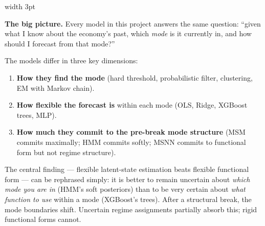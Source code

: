 \documentclass[11pt, a4paper]{article}
\newenvironment{greenbox}{%
  \vspace{4pt}\par\noindent%
  {\color{mygreen}\vrule width 3pt}\hspace{6pt}%
  \begin{minipage}{\dimexpr\linewidth-9pt\relax}\vspace{2pt}%
}{%
  \vspace{2pt}\end{minipage}\par\vspace{4pt}%
}
\begin{document}
\bigskip

\begin{greenbox}
\textbf{The big picture.}
Every model in this project answers the same question: ``given what I know
about the economy's past, which \emph{mode} is it currently in, and how should
I forecast from that mode?''

The models differ in three key dimensions:
\begin{enumerate}[itemsep=2pt]
  \item \textbf{How they find the mode} (hard threshold, probabilistic filter,
        clustering, EM with Markov chain).
  \item \textbf{How flexible the forecast is} within each mode (OLS, Ridge,
        XGBoost trees, MLP).
  \item \textbf{How much they commit to the pre-break mode structure} (MSM
        commits maximally; HMM commits softly; MSNN commits to functional form
        but not regime structure).
\end{enumerate}

The central finding --- flexible latent-state estimation beats flexible
functional form --- can be rephrased simply: it is better to remain uncertain
about \emph{which mode you are in} (HMM's soft posteriors) than to be very
certain about \emph{what function to use} within a mode (XGBoost's trees).
After a structural break, the mode boundaries shift. Uncertain regime
assignments partially absorb this; rigid functional forms cannot.
\end{greenbox}
\end{document}
